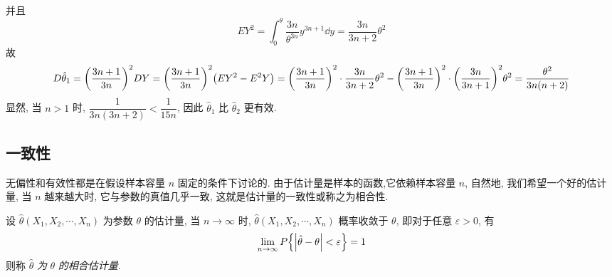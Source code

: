 \begin{solution}
\begin{enumerate}[label=(\arabic{*})]
        并且 $$
        EY^2=\int_{0}^{\theta} \dfrac{3n}{\theta^{3n}}y^{3n+1} \dd y=\dfrac{3n}{3n+2}\theta^2
        $$
        故
        $$
        D\hat{\theta}_1=\qty(\dfrac{3n+1}{3n})^2DY=\qty(\dfrac{3n+1}{3n})^2\qty(EY^2-E^2Y)=\qty(\dfrac{3n+1}{3n})^2\cdot\dfrac{3n}{3n+2}\theta^2-\qty(\dfrac{3n+1}{3n})^2\cdot\qty(\dfrac{3n}{3n+1})^2\theta^2=\dfrac{\theta^2}{3n(n+2)}
        $$
        显然, 当 $n>1$ 时, $\dfrac{1}{3n(3n+2)}<\dfrac{1}{15n}$, 因此 $\hat{\theta}_1$ 比 $\hat{\theta}_2$ 更有效.
    \end{enumerate}
\end{solution}

\subsection{一致性}

无偏性和有效性都是在假设样本容量 $n$ 固定的条件下讨论的.
由于估计量是样本的函数,它依赖样本容量 $n$, 自然地, 我们希望一个好的估计量, 当 $n$ 越来越大时, 它与参数的真值几乎一致, 
这就是估计量的一致性或称之为相合性.

\begin{definition}[一致性]
    设 $ \hat{\theta}\left(X_{1}, X_{2}, \cdots, X_{n}\right) $ 为参数 $ \theta $ 的估计量, 当 $ n \to \infty $ 时, $\hat{\theta}\left(X_{1}, X_{2}, \cdots, X_{n}\right) $ 概率收敛于
    $ \theta $, 即对于任意 $ \varepsilon>0 $, 有
    $$\lim _{n \to \infty} P\qty{\qty|\hat{\theta}-\theta|<\varepsilon}=1$$
    则称 $ \hat{\theta} $ \textit{为} $ \theta $ \textit{的相合估计量}.
\end{definition}

